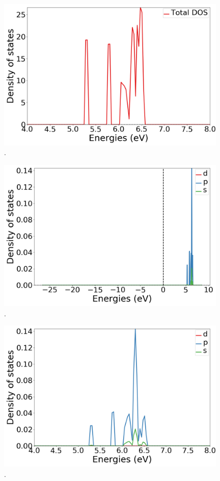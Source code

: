 \documentclass{article}
\begin{document}
  \begin{figure}[H]
      \centering
      \includegraphics[width = 11cm]{../fig/DOS_k4_TDOS_2.png}
      \caption{. }
      \label{fig:DOS_k4_TDOS_2}
  \end{figure}

  \begin{figure}[H]
      \centering
      \includegraphics[width = 11cm]{../fig/DOS_k4_LDOS25_1.png}
      \caption{.}
      \label{fig:DOS_k4_LDOS25_1}
  \end{figure}

  \begin{figure}[H]
      \centering
      \includegraphics[width = 11cm]{../fig/DOS_k4_LDOS25_2.png}
      \caption{. }
      \label{fig:DOS_k4_LDOS25_2}
  \end{figure}
\end{document}
